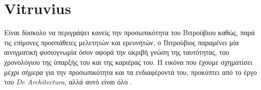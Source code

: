 
\section{Vitruvius}

Είναι δύσκολο να περιγράψει κανείς την προσωπικότητα του Βιτρούβιου καθώς, παρά 
τις επίμονες προσπάθειες μελετητών και ερευνητών, ο Βιτρούβιος παραμένει 
μία αινιγματική φυσιογνωμία όσον αφορά την ακριβή γνώση της ταυτότητας, του 
χρονολόγιου της ύπαρξής του και της καριέρας του. Η εικόνα που έχουμε 
σχηματίσει μέχρι σήμερα για την προσωπικότητα και τα ενδιαφέροντά του, 
προκύπτει από το έργο του \emph{De Architectura}, αλλά αυτό είναι όλο 
\cite{baldwin-1990}.  
